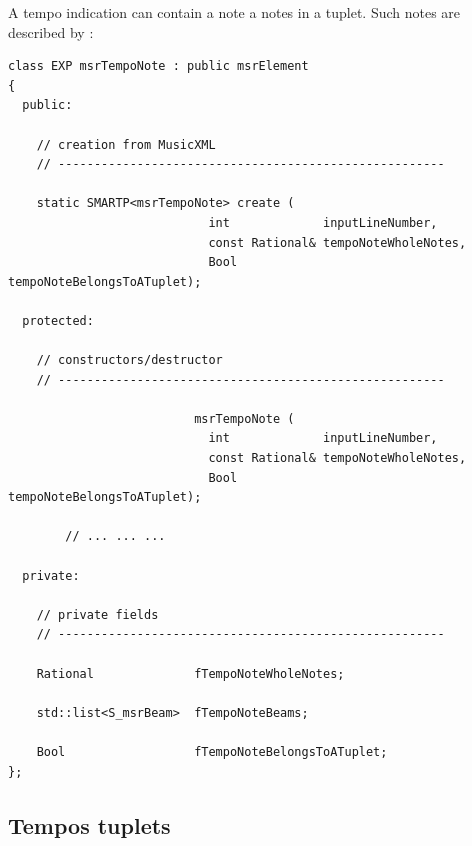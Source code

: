 A tempo indication can contain a note a notes in a tuplet. Such notes are described by :
\begin{lstlisting}[language=CPlusPlus]
class EXP msrTempoNote : public msrElement
{
  public:

    // creation from MusicXML
    // ------------------------------------------------------

    static SMARTP<msrTempoNote> create (
                            int             inputLineNumber,
                            const Rational& tempoNoteWholeNotes,
                            Bool            tempoNoteBelongsToATuplet);

  protected:

    // constructors/destructor
    // ------------------------------------------------------

                          msrTempoNote (
                            int             inputLineNumber,
                            const Rational& tempoNoteWholeNotes,
                            Bool            tempoNoteBelongsToATuplet);

		// ... ... ...

  private:

    // private fields
    // ------------------------------------------------------

    Rational              fTempoNoteWholeNotes;

    std::list<S_msrBeam>  fTempoNoteBeams;

    Bool                  fTempoNoteBelongsToATuplet;
};
\end{lstlisting}

\subsection{Tempos tuplets}\label{Tempos tuplets}

